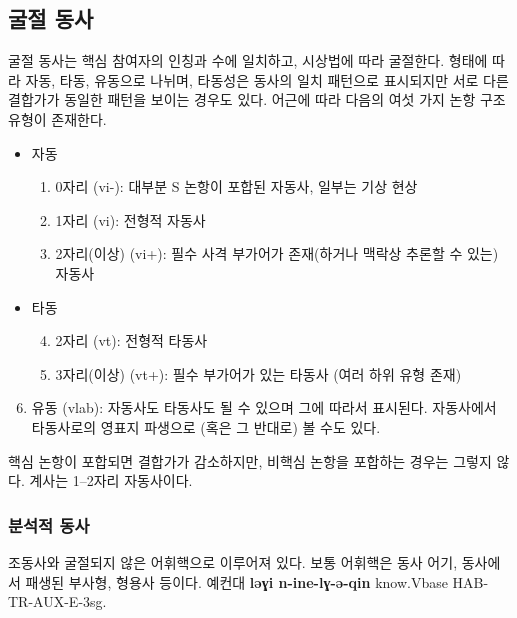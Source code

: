 \subsection{굴절 동사}
굴절 동사는 핵심 참여자의 인칭과 수에 일치하고, 시상법에 따라 굴절한다. 형태에 따라 자동, 타동, 유동으로 나뉘며, 타동성은 동사의 일치 패턴으로 표시되지만 서로 다른 결합가가 동일한 패턴을 보이는 경우도 있다. 어근에 따라 다음의 여섯 가지 논항 구조 유형이 존재한다.
\begin{itemize}
	\item 자동
	\begin{enumerate}
		\item 0자리 (vi-): 대부분 S 논항이 포합된 자동사, 일부는 기상 현상
		\item 1자리 (vi): 전형적 자동사
		\item 2자리(이상) (vi+): 필수 사격 부가어가 존재(하거나 맥락상 추론할 수 있는) 자동사
	\end{enumerate}
	\item 타동
	\begin{enumerate}
	\setcounter{enumi}{3}
		\item 2자리 (vt): 전형적 타동사
		\item 3자리(이상) (vt+): 필수 부가어가 있는 타동사 (여러 하위 유형 존재)
	\end{enumerate}
\end{itemize}
\begin{enumerate}
\setcounter{enumi}{5}
	\item 유동 (vlab): 자동사도 타동사도 될 수 있으며 그에 따라서 표시된다. 자동사에서 타동사로의 영표지 파생으로 (혹은 그 반대로) 볼 수도 있다. 
\end{enumerate}
핵심 논항이 포합되면 결합가가 감소하지만, 비핵심 논항을 포합하는 경우는 그렇지 않다. 계사는 1--2자리 자동사이다.
\subsubsection{분석적 동사}
조동사와 굴절되지 않은 어휘핵으로 이루어져 있다. 보통 어휘핵은 동사 어기, 동사에서 패생된 부사형, 형용사 등이다. 예컨대 \textbf{ləɣi n-ine-lɣ-ə-qin}	know.Vbase HAB-TR-AUX-E-3sg.
